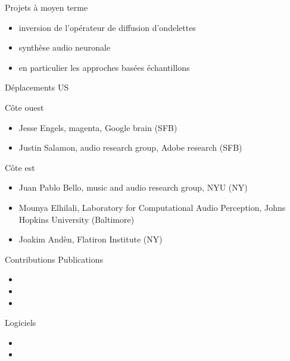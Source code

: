 \begin{frame}{Projets à moyen terme}
\begin{itemize}
\item inversion de l'opérateur de diffusion d'ondelettes
\item synthèse audio neuronale
\item en particulier les approches basées échantillons
\end{itemize}
\end{frame}

\begin{frame}{Déplacements US}
\begin{block}{Côte ouest}
\begin{itemize}
\item Jesse Engels, magenta, Google brain (SFB)
\item Justin Salamon, audio research group, Adobe research (SFB)
\end{itemize}
\end{block}
\begin{block}{Côte est}
\begin{itemize}
\item Juan Pablo Bello, music and audio research group, NYU (NY) 
\item Mounya Elhilali, Laboratory for Computational Audio Perception, Johns Hopkins University (Baltimore)
\item Joakim Andèn, Flatiron Institute (NY)
\end{itemize}
\end{block}
\end{frame}

\begin{frame}{Contributions}
\small
Publications
\begin{itemize}
\item {}
\item {}
\item {}
\end{itemize}
Logiciels
\begin{itemize}
\item {}
\item {}
\end{itemize}
\end{frame}
